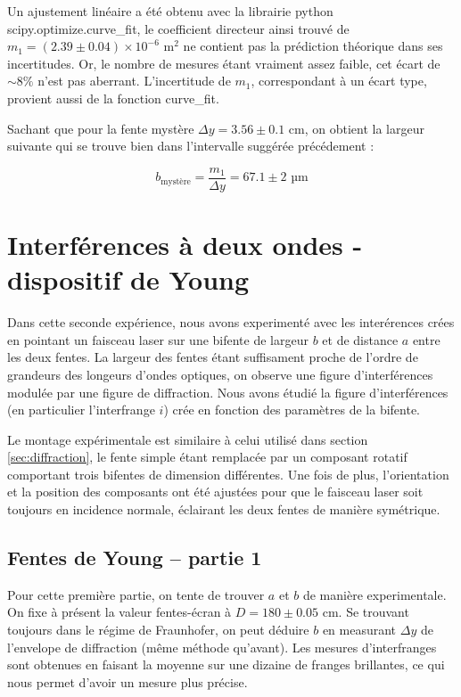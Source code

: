 \documentclass{article}
\begin{document}
Un ajustement linéaire a été obtenu avec la librairie python {\color{blue}scipy.optimize.curve_fit}, le coefficient directeur 
ainsi trouvé de $m_1 = (2.39 \pm 0.04)\times 10^{-6} \textrm{ m}^2$ ne contient pas la 
prédiction théorique dans ses incertitudes. Or, le nombre de mesures étant vraiment assez faible, 
cet écart de $\sim 8\%$ n'est pas aberrant. L’incertitude de $m_1$, correspondant à un écart type, provient aussi de la fonction {\color{blue}curve_fit}.

Sachant que pour la fente mystère $\Delta y = 3.56 \pm 0.1 \textrm{ cm}$, on obtient la largeur suivante qui se trouve bien dans l'intervalle suggérée précédement :

$$ b_{\textrm{mystère}} = \frac{m_1}{\Delta y} = 67.1 \pm 2 \textrm{ µm}$$

\section{Interférences à deux ondes - dispositif de Young}

Dans cette seconde expérience, nous avons experimenté avec les interérences crées en 
pointant un faisceau laser sur une bifente de largeur $b$ et de distance $a$ entre les deux fentes.
La largeur des fentes étant suffisament proche de l'ordre de grandeurs des longeurs d'ondes optiques, on observe une figure d'interférences 
modulée par une figure de diffraction. 
Nous avons étudié la figure d'interférences (en particulier l'interfrange $i$) crée en fonction des paramètres de la bifente.

Le montage expérimentale est similaire à celui utilisé dans section \ref{sec:diffraction}, le fente simple étant remplacée par un 
composant rotatif comportant trois bifentes de dimension différentes. Une fois de plus, l'orientation
et la position des composants ont été ajustées pour que le faisceau laser soit toujours en incidence normale, éclairant les
deux fentes de manière symétrique.

\subsection{Fentes de Young – partie 1}
Pour cette première partie, on tente de trouver $a$ et $b$ de manière experimentale. On fixe à présent la valeur fentes-écran à $D = 180 \pm 0.05 \textrm{ cm}$.
Se trouvant toujours dans le régime de Fraunhofer, on peut déduire $b$ en measurant $\Delta y$ de l'envelope de diffraction (même méthode qu'avant).
Les mesures d'interfranges sont obtenues en faisant la moyenne sur une dizaine de franges brillantes, ce qui nous permet d'avoir un mesure plus précise.
\end{document}
